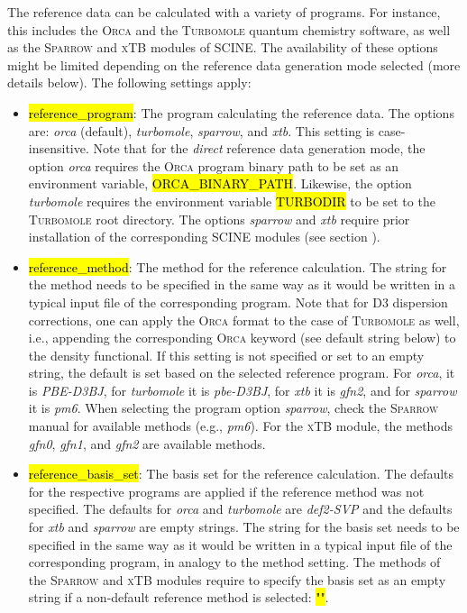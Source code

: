 \documentclass[]{tufte-book}
\begin{document}
The reference data can be calculated with a variety of programs. For instance, this includes the \textsc{Orca}\cite{orca} and the \textsc{Turbomole}\cite{ahlrichs89} quantum chemistry software, as well as the \textsc{Sparrow}\cite{sparrow_zenodo} and \textsc{xTB}\cite{bannwarth20} modules of SCINE. The availability of these options might be limited depending on the reference data generation mode selected (more details below). The following settings apply:

\begin{itemize}
\item \hl{reference\_program}: The program calculating the reference data. The options are: \textit{orca} (default), \textit{turbomole}, \textit{sparrow}, and \textit{xtb}. This setting is case-insensitive. Note that for the \textit{direct} reference data generation mode, the option \textit{orca} requires the \textsc{Orca} program binary path to be set as an environment variable, \hl{ORCA\_BINARY\_PATH}. Likewise, the option \textit{turbomole} requires the environment variable \hl{TURBODIR} to be set to the \textsc{Turbomole} root directory. The options \textit{sparrow} and \textit{xtb} require prior installation of the corresponding SCINE modules (see section ).
\item \hl{reference\_method}: The method for the reference calculation. The string for the method needs to be specified in the same way as it would be written in a typical input file of the
corresponding program. Note that for D3 dispersion corrections, one can apply the \textsc{Orca} format to the case of \textsc{Turbomole} as well, i.e., appending the corresponding \textsc{Orca} keyword (see default string below) to the density functional.
If this setting is not specified or set to an empty string, the default is set based on the selected reference program. For \textit{orca}, it is \textit{PBE-D3BJ}, for \textit{turbomole} it is \textit{pbe-D3BJ}, for \textit{xtb} it is \textit{gfn2}, and for \textit{sparrow} it is \textit{pm6}.
When selecting the program option \textit{sparrow}, check the \textsc{Sparrow} manual\cite{sparrow_zenodo} for available methods (e.g., \textit{pm6}). For the \textsc{xTB} module, the methods \textit{gfn0}, \textit{gfn1}, and \textit{gfn2} are available methods.
\item \hl{reference\_basis\_set}: The basis set for the reference calculation. The defaults for the respective programs are applied if the reference method was not specified. The defaults for \textit{orca} and \textit{turbomole} are \textit{def2-SVP} and the defaults for \textit{xtb} and \textit{sparrow} are empty strings. The string for the basis set needs to be specified in the same way as it would be written in a typical input file of the corresponding program, in analogy to the method setting. The methods of the \textsc{Sparrow} and \textsc{xTB} modules require to specify the basis set as an empty string if a non-default reference method is selected: \hl{"\:"}.

\end{itemize}
\end{document}
